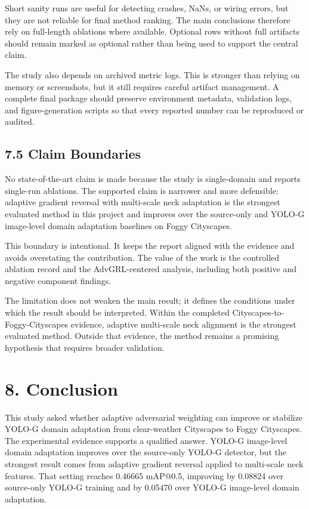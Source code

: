\documentclass[
  11pt,
]{article}
\begin{document}
Short sanity runs are useful for detecting crashes, NaNs, or wiring
errors, but they are not reliable for final method ranking. The main
conclusions therefore rely on full-length ablations where available.
Optional rows without full artifacts should remain marked as optional
rather than being used to support the central claim.

The study also depends on archived metric logs. This is stronger than
relying on memory or screenshots, but it still requires careful artifact
management. A complete final package should preserve environment
metadata, validation logs, and figure-generation scripts so that every
reported number can be reproduced or audited.

\hypertarget{claim-boundaries}{%
\subsection{7.5 Claim Boundaries}\label{claim-boundaries}}

No state-of-the-art claim is made because the study is single-domain and
reports single-run ablations. The supported claim is narrower and more
defensible: adaptive gradient reversal with multi-scale neck adaptation
is the strongest evaluated method in this project and improves over the
source-only and YOLO-G image-level domain adaptation baselines on Foggy
Cityscapes.

This boundary is intentional. It keeps the report aligned with the
evidence and avoids overstating the contribution. The value of the work
is the controlled ablation record and the AdvGRL-centered analysis,
including both positive and negative component findings.

The limitation does not weaken the main result; it defines the
conditions under which the result should be interpreted. Within the
completed Cityscapes-to-Foggy-Cityscapes evidence, adaptive multi-scale
neck alignment is the strongest evaluated method. Outside that evidence,
the method remains a promising hypothesis that requires broader
validation.

\hypertarget{conclusion}{%
\section{8. Conclusion}\label{conclusion}}

This study asked whether adaptive adversarial weighting can improve or
stabilize YOLO-G domain adaptation from clear-weather Cityscapes to
Foggy Cityscapes. The experimental evidence supports a qualified answer.
YOLO-G image-level domain adaptation improves over the source-only
YOLO-G detector, but the strongest result comes from adaptive gradient
reversal applied to multi-scale neck features. That setting reaches
0.46665 mAP@0.5, improving by 0.08824 over source-only YOLO-G training
and by 0.05470 over YOLO-G image-level domain adaptation.
\end{document}
